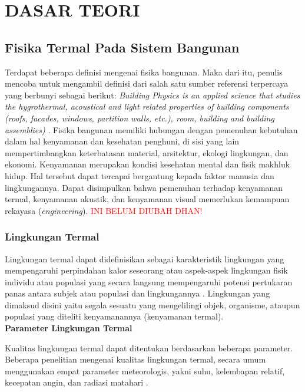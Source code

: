 \chapter{DASAR TEORI}
\label{dasar-teori}

\section{Fisika Termal Pada Sistem Bangunan}

Terdapat beberapa definisi mengenai fisika bangunan. Maka dari itu, penulis mencoba untuk mengambil definisi dari salah satu sumber referensi terpercaya yang berbunyi sebagai berikut: \textit{Building Physics is an applied science that studies the hygrothermal, acoustical and light related properties of building components (roofs, facades, windows, partition walls, etc.), room, building and building assemblies)} \cite{BuildingPhysics}. Fisika bangunan memiliki hubungan dengan pemenuhan kebutuhan dalam hal kenyamanan dan kesehatan penghuni, di sisi yang lain mempertimbangkan keterbatasan material, arsitektur, ekologi lingkungan, dan ekonomi. Kenyamanan merupakan kondisi kesehatan mental dan fisik makhluk hidup. Hal tersebut dapat tercapai bergantung kepada faktor manusia dan lingkungannya. Dapat disimpulkan bahwa pemenuhan terhadap kenyamanan termal, kenyamanan akustik, dan kenyamanan visual memerlukan kemampuan rekayasa (\textit{engineering}). \textcolor{red}{INI BELUM DIUBAH DHAN!}

\subsection{Lingkungan Termal}

Lingkungan termal dapat didefinisikan sebagai karakteristik lingkungan yang mempengaruhi perpindahan kalor seseorang \cite{ASHRAE55} atau aspek-aspek lingkungan fisik individu atau populasi yang secara langsung mempengaruhi potensi pertukaran panas antara subjek atau populasi dan lingkungannya \cite{book1}. Lingkungan yang dimaksud disini yaitu segala sesuatu yang mengelilingi objek, organisme, ataupun populasi yang diteliti kenyamanannya (kenyamanan termal). \\

\noindent \textbf{Parameter Lingkungan Termal}

Kualitas lingkungan termal dapat ditentukan berdasarkan beberapa parameter. Beberapa penelitian mengenai kualitas lingkungan termal, secara umum menggunakan empat parameter meteorologis, yakni suhu, kelembapan relatif, kecepatan angin, dan radiasi matahari \cite{book1}.

